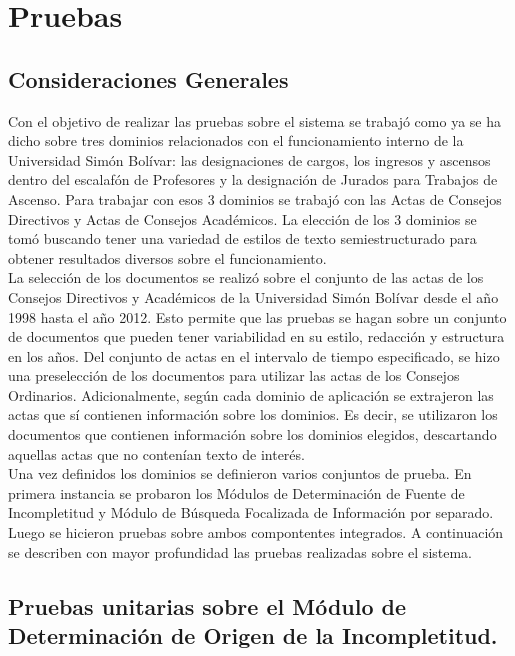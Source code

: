 \chapter{Pruebas} \label{chap:pruebas}

\section{Consideraciones Generales} 

Con el objetivo de realizar las pruebas sobre el sistema se trabajó como ya se ha dicho sobre tres dominios relacionados con el funcionamiento interno de la Universidad Simón Bolívar: las designaciones de cargos, los ingresos y ascensos dentro del escalafón de Profesores y la designación de Jurados para Trabajos de Ascenso. Para trabajar con esos 3 dominios se trabajó con las Actas de Consejos Directivos y Actas de Consejos Académicos. La elección de los 3 dominios se tomó buscando tener una variedad de estilos de texto semiestructurado para obtener resultados diversos sobre el funcionamiento. \\

La selección de los documentos se realizó sobre el conjunto de las actas de los Consejos Directivos y Académicos de la Universidad Simón Bolívar desde el año 1998 hasta el año 2012. Esto permite que las pruebas se hagan sobre un conjunto de documentos que pueden tener variabilidad en su estilo, redacción y estructura en los años. Del conjunto de actas en el intervalo de tiempo especificado, se hizo una preselección de los documentos para utilizar las actas de los Consejos Ordinarios. Adicionalmente, según cada dominio de aplicación se extrajeron las actas que sí contienen información sobre los dominios. Es decir, se utilizaron los documentos que contienen información sobre los dominios elegidos, descartando aquellas actas que no contenían texto de interés.\\

Una vez definidos los dominios se definieron varios conjuntos de prueba. En primera instancia se probaron los Módulos de Determinación de Fuente de Incompletitud y Módulo de Búsqueda Focalizada de Información por separado. Luego se hicieron pruebas sobre ambos compontentes integrados. A continuación se describen con mayor profundidad las pruebas realizadas sobre el sistema. 

\section{Pruebas unitarias sobre el Módulo de Determinación de Origen de la Incompletitud.} 

